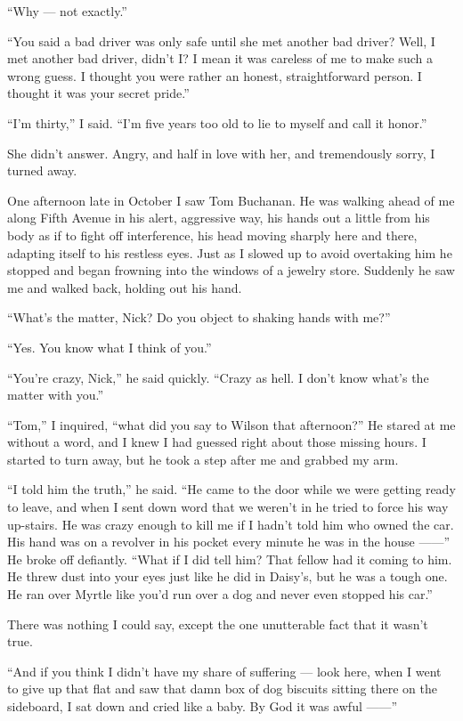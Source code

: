 \documentclass{znotebook}
\begin{document}
``Why — not exactly.''

``You said a bad driver was only safe until she met another bad driver? Well, I met another bad driver, didn’t I? I mean it was careless of me to make such a wrong guess. I thought you were rather an honest, straightforward person. I thought it was your secret pride.''

``I’m thirty,'' I said. ``I’m five years too old to lie to myself and call it honor.''

She didn’t answer. Angry, and half in love with her, and tremendously sorry, I turned away.

One afternoon late in October I saw Tom Buchanan. He was walking ahead of me along Fifth Avenue in his alert, aggressive way, his hands out a little from his body as if to fight off interference, his head moving sharply here and there, adapting itself to his restless eyes. Just as I slowed up to avoid overtaking him he stopped and began frowning into the windows of a jewelry store. Suddenly he saw me and walked back, holding out his hand.

``What’s the matter, Nick? Do you object to shaking hands with me?''

``Yes. You know what I think of you.''

``You’re crazy, Nick,'' he said quickly. ``Crazy as hell. I don’t know what’s the matter with you.''

``Tom,'' I inquired, ``what did you say to Wilson that afternoon?'' He stared at me without a word, and I knew I had guessed right about those missing hours. I started to turn away, but he took a step after me and grabbed my arm.

``I told him the truth,'' he said. ``He came to the door while we were getting ready to leave, and when I sent down word that we weren’t in he tried to force his way up-stairs. He was crazy enough to kill me if I hadn’t told him who owned the car. His hand was on a revolver in his pocket every minute he was in the house ——'' He broke off defiantly. ``What if I did tell him? That fellow had it coming to him. He threw dust into your eyes just like he did in Daisy’s, but he was a tough one. He ran over Myrtle like you’d run over a dog and never even stopped his car.''

There was nothing I could say, except the one unutterable fact that it wasn’t true.

``And if you think I didn’t have my share of suffering — look here, when I went to give up that flat and saw that damn box of dog biscuits sitting there on the sideboard, I sat down and cried like a baby. By God it was awful ——''
\end{document}
